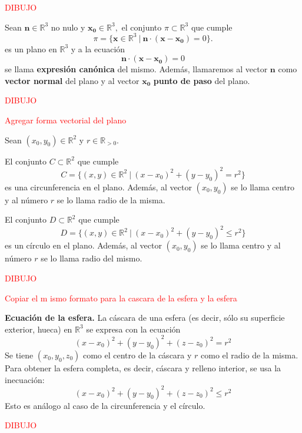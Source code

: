 \textcolor{red}{DIBUJO}


\begin{definition} Sean    $\boldsymbol{n}\in\mathbb{R}^3$   no nulo  y  $\boldsymbol{x_0}\in\mathbb{R}^3,$  el conjunto $\pi \subset \mathbb{R}^3 $  que cumple  
    \begin{equation*}
      \pi  = \{   \boldsymbol{x} \in\mathbb{R}^3  \:| \:    \boldsymbol{n}\cdot(\boldsymbol{x} - \boldsymbol{x_0}) =0   \}.
    \end{equation*} es un plano en $\mathbb{R}^3$  y a la ecuaci\'on   $$ \boldsymbol{n}\cdot(\boldsymbol{x} - \boldsymbol{x_0}) =0$$  se llama  \textbf{expresi\'on canónica} del mismo.  Adem\'as, llamaremos al vector $\boldsymbol{n}$   como \textbf{vector normal} del plano 
    y al vector  $\boldsymbol{x_0}$  \textbf{ punto de paso }  del  plano. 
 \end{definition}
   
   \textcolor{red}{DIBUJO}
   
  \textcolor{red}{Agregar forma vectorial del plano}

  
  

\begin{definition} Sean  $(x_0,y_0) \in \mathbb{R}^2$ y $r \in \mathbb{R}_{ > 0}. $

  El conjunto $C \subset \mathbb{R}^2$ que cumple
    \begin{equation*}\label{circ}
    C = \{  (x,y)  \in \mathbb{R}^2 \:|\:   (x-x_0)^2+(y-y_0)^2=r^2 \}
    \end{equation*}  es una circunferencia en el plano. Adem\'as, al vector $(x_0,y_0)$  se lo llama centro y al n\'umero $r$  se lo llama radio de la misma.
   
  El conjunto $D \subset \mathbb{R}^2$ que cumple
    \begin{equation*}
    D = \{  (x,y)  \in \mathbb{R}^2 \:|\:   (x-x_0)^2+(y-y_0)^2 \leq r^2 \}
    \end{equation*}  es un c\'irculo en el plano. Adem\'as, al vector $(x_0,y_0)$  se lo llama centro y al n\'umero $r$  se lo llama radio del mismo.  
   \end{definition}
   \textcolor{red}{DIBUJO}
   
   \textcolor{red}{Copiar el m ismo  formato para la cascara de la esfera y la esfera }
   
   
\begin{definition}\textbf{Ecuación de la esfera.}
    La cáscara de una esfera (es decir, sólo su superficie exterior, hueca) 
    en $\mathbb{R}^3$ se expresa con la ecuación
    \begin{equation*}
        (x-x_0)^2+(y-y_0)^2+(z-z_0)^2=r^2
    \end{equation*}
    Se tiene $(x_0,y_0,z_0)$ como el centro de la cáscara y $r$ como el radio de la misma.
    Para obtener la esfera completa, es decir, cáscara y relleno interior, se usa la inecuación:
    \begin{equation*}
        (x-x_0)^2+(y-y_0)^2+(z-z_0)^2\leq r^2
    \end{equation*}
    Esto es análogo al caso de la circunferencia y el círculo.
\end{definition}

\textcolor{red}{DIBUJO}
   